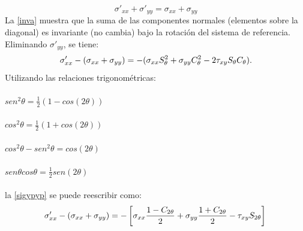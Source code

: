 \documentclass[../notas medios.tex]{subfiles}
\begin{document}
\begin{equation}
	\sigma ' _{xx} + \sigma ' _{yy} =   \sigma _{xx} +  \sigma _{yy}
	\label{inva}
\end{equation}
%
La  \cref{inva} muestra que la suma de las componentes normales (elementos sobre la diagonal) es invariante (no cambia) bajo la rotación del sistema de referencia. Eliminando $\sigma ' _{yy}$, se tiene:\\
%
\begin{equation}
	\sigma ' _{xx} -(\sigma _{xx} + \sigma _{yy}) = -(\sigma _{xx} S^2 _\theta + \sigma _{yy} C^2 _\theta - 2 \tau _{xy} S _\theta C_\theta). \\
\label{sigypyp}
\end{equation}
%
Utilizando las relaciones trigonométricas:\\
\\
	$sen ^2 \theta = \frac{1}{2} \left( 1 - cos \left( 2 \theta \right) \right)$\\\\
	$cos ^2 \theta = \frac{1}{2} \left( 1 + cos \left( 2 \theta \right) \right)$\\\\
	$ cos ^2 \theta -sen ^2 \theta =  cos \left( 2 \theta \right)$\\\\
	$sen \theta cos  \theta = \frac{1}{2} sen \left( 2 \theta \right)$ \\\\
%
la \cref{sigypyp} se puede reescribir como: \\

\begin{equation*}
	\sigma ' _{xx} -(\sigma _{xx} + \sigma _{yy}) = -\left[ \sigma _{xx} \frac{1-C_{2\theta}}{2} + \sigma _{yy} \frac{1+ C _{2\theta}}{2} - \tau _{xy} S_{2\theta} \right] \\
\end{equation*} \\\\
\end{document}
